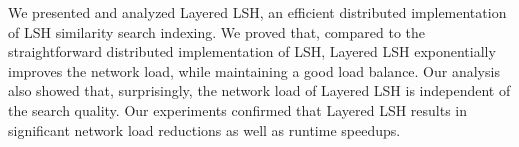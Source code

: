 \documentclass{acm_proc_article-sp}
\numberwithin{equation}{section}
\numberwithin{figure}{section}
\newcommand{\comment}[1]{}
\begin{document}
We presented and analyzed Layered LSH, an efficient distributed implementation of LSH similarity search indexing. We proved that, compared to the straightforward distributed implementation of LSH, Layered LSH exponentially improves the network load, while maintaining a good load balance. Our analysis also showed that, surprisingly, the network load of Layered LSH is independent of the search quality. Our experiments confirmed that Layered LSH results in significant network load reductions as well as runtime speedups.  

\comment{
In this paper, we describe a network efficient distributed implementation, Layered LSH, which exponentially reduces network costs relative to the naive implementation while maintaining load balance. Surprisingly, we show that the network cost associated with Layered LSH are independent of the desired accuracy of LSH. 
}




\end{document}
